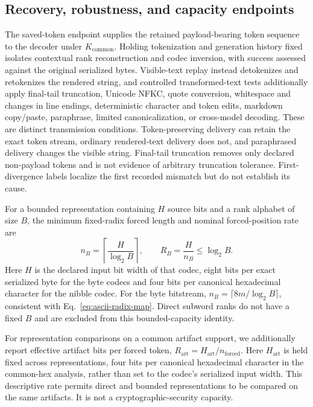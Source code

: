 \documentclass[fleqn,10pt]{wlscirep}
\begin{document}
\subsection*{Recovery, robustness, and capacity endpoints}\label{sec:replay-method}\label{sec:capacity-method}\label{sec:endpoint-method}

The saved-token endpoint supplies the retained payload-bearing token sequence to the decoder under \(K_{\mathrm{common}}\). Holding tokenization and generation history fixed isolates contextual rank reconstruction and codec inversion, with success assessed against the original serialized bytes. Visible-text replay instead detokenizes and retokenizes the rendered string, and controlled transformed-text tests additionally apply final-tail truncation, Unicode NFKC, quote conversion, whitespace and changes in line endings, deterministic character and token edits, markdown copy/paste, paraphrase, limited canonicalization, or cross-model decoding\cite{YanMurawaki2025TokenizationInconsistency}. These are distinct transmission conditions. Token-preserving delivery can retain the exact token stream, ordinary rendered-text delivery does not, and paraphrased delivery changes the visible string. Final-tail truncation removes only declared non-payload tokens and is not evidence of arbitrary truncation tolerance. First-divergence labels localize the first recorded mismatch but do not establish its cause.


For a bounded representation containing \(H\) source bits and a rank alphabet of size \(B\), the minimum fixed-radix forced length and nominal forced-position rate are
\begin{equation}
n_B=\left\lceil\frac{H}{\log_2B}\right\rceil,
\qquad
R_B=\frac{H}{n_B}\le\log_2B.
\label{eq:capacity}
\end{equation}
Here \(H\) is the declared input bit width of that codec, eight bits per exact serialized byte for the byte codecs and four bits per canonical hexadecimal character for the nibble codec. For the byte bitstream, \(n_B=\lceil8m/\log_2B\rceil\), consistent with Eq.~\eqref{eq:ascii-radix-map}. Direct subword ranks do not have a fixed \(B\) and are excluded from this bounded-capacity identity.

For representation comparisons on a common artifact support, we additionally report effective artifact bits per forced token, \(R_{\mathrm{art}}=H_{\mathrm{art}}/n_{\mathrm{forced}}\). Here \(H_{\mathrm{art}}\) is held fixed across representations, four bits per canonical hexadecimal character in the common-hex analysis, rather than set to the codec's serialized input width. This descriptive rate permits direct and bounded representations to be compared on the same artifacts. It is not a cryptographic-security capacity.
\end{document}
